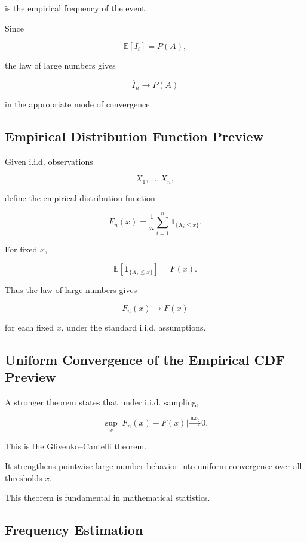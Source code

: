 is the empirical frequency of the event.

Since

\[
\mathbb{E}[I_i]
=
P(A),
\]

the law of large numbers gives

\[
\boxed{
\overline{I}_n
\to
P(A)
}
\]

in the appropriate mode of convergence.

\subsection{Empirical Distribution Function Preview}
\label{subsec:empirical-cdf-preview}

Given i.i.d. observations

\[
X_1,\ldots,X_n,
\]

define the empirical distribution function

\[
\boxed{
F_n(x)
=
\frac1n
\sum_{i=1}^{n}
\mathbf{1}_{\{X_i\leq x\}}.
}
\]

For fixed \(x\),

\[
\mathbb{E}
[
\mathbf{1}_{\{X_i\leq x\}}
]
=
F(x).
\]

Thus the law of large numbers gives

\[
\boxed{
F_n(x)
\to
F(x)
}
\]

for each fixed \(x\), under the standard i.i.d. assumptions.

\subsection{Uniform Convergence of the Empirical CDF Preview}
\label{subsec:glivenko-cantelli-preview}

A stronger theorem states that under i.i.d. sampling,

\[
\boxed{
\sup_x
|F_n(x)-F(x)|
\xrightarrow{\text{a.s.}}
0.
}
\]

This is the Glivenko--Cantelli theorem.

It strengthens pointwise large-number behavior into uniform convergence
over all thresholds \(x\).

This theorem is fundamental in mathematical statistics.

\subsection{Frequency Estimation}
\label{subsec:frequency-estimation}

